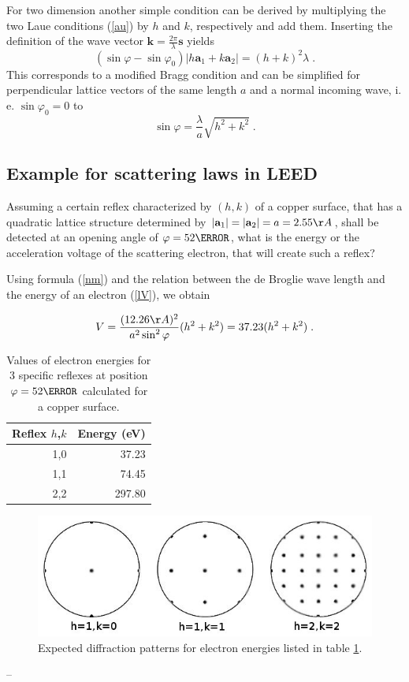 \documentclass[a4paper]{scrartcl}
\numberwithin{equation}{section}
\numberwithin{figure}{section}
\numberwithin{table}{section}
\newcommand{\eq}[2]{\begin{equation}#1\label{#2}\end{equation}}
\newcommand{\Formel}[1]{(\ref{#1})}
\newcommand{\ve}[1]{\mathbf{ #1} }
\begin{document}
For two dimension another simple condition can be derived by multiplying the two Laue conditions \Formel{au} by $h$ and $k$, respectively and add them. Inserting the definition of the wave vector $\ve k=\frac{2\pi}{\lambda} \ve s$ yields
\eq{(\sin \varphi - \sin \varphi_0) |h \ve a_1 + k \ve a_2| = (h + k)^2 \lambda \; .} {}
This corresponds to a modified Bragg condition and can be simplified for perpendicular lattice vectors of the same length $a$ and a normal incoming wave, i. e. $\sin \varphi_0  =0$ to
\eq{\sin \varphi =\frac{\lambda}{a} \sqrt{h^2+k^2} \; .}{nm}

\subsection{Example for scattering laws in LEED}
Assuming a certain reflex characterized by $(h,k)$ of a copper surface, that has a quadratic lattice structure determined by $|\ve a_1|=|\ve a_2|=a=2.55 \AA$, shall be detected at an opening angle of $\varphi = 52 \degree$, what is the energy or the acceleration voltage of the scattering electron, that will create such a reflex?

Using formula \Formel{nm} and the relation between the de Broglie wave length and the energy of an electron \Formel{lV}, we obtain

\eq{ V =\frac{(12.26 \AA)^2}{a^2 \sin^2 \varphi} (h^2+k^2) = 37.23 (h^2 +k^2) \; .}{V}

\begin{table}[!h]
\centering
\begin{tabular}{rr}
\toprule
Reflex $h$,$k$ & Energy (eV) \\
\midrule
1,0 & 37.23 \\
1,1 & 74.45 \\
2,2 & 297.80 \\
 \bottomrule
\end{tabular}
\caption{\small Values of electron energies for 3 specific reflexes at position $\varphi =52\degree$ calculated for a copper surface. }
\label{kll}
\end{table}

\begin{figure}
  \centering
   	\includegraphics[width=0.7\linewidth]{pic/52.jpeg}

 \caption{\small Expected diffraction patterns for electron energies listed in table \ref{kll}.}
        \label{fig:bragg}
\end{figure}
--
\end{document}
